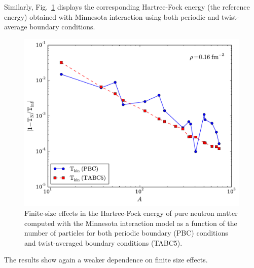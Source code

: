 Similarly, Fig.~\ref{fig:fig4} displays the corresponding Hartree-Fock energy (the reference energy) 
obtained with Minnesota interaction using both periodic and twist-average boundary conditions.  
  \begin{figure}
    \includegraphics[width=\linewidth]{Chapter8-figures/fig4.pdf}
    \caption{Finite-size effects in the Hartree-Fock energy of pure
      neutron matter computed with the Minnesota interaction model  \cite{minnesota} as a
      function of the number of particles for both periodic boundary (PBC)
      conditions and twist-averaged boundary conditions (TABC5).}
    \label{fig:fig4}
  \end{figure}
The results show again a weaker dependence on finite size effects.

